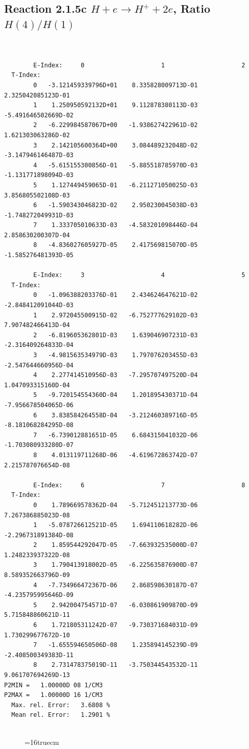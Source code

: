 \documentclass[12pt,dvipdfmx]{article}
\begin{document}
\newpage
\subsection{
Reaction 2.1.5c  $H + e \rightarrow H^+ + 2e$, Ratio $H(4)/H(1)$
}


\begin{small}\begin{verbatim}


        E-Index:     0                     1                     2
  T-Index:
        0   -3.121459339796D+01    8.335828009713D-01    2.325042085123D-01
        1    1.250950592132D+01    9.112878380113D-03   -5.491646502669D-02
        2   -6.229984587067D+00   -1.938627422961D-02    1.621303063286D-02
        3    2.142105600364D+00    3.084489232048D-02   -3.147946146487D-03
        4   -5.615155300856D-01   -5.885518785970D-03   -1.131771898094D-03
        5    1.127449459065D-01   -6.211271050025D-03    3.856805502108D-03
        6   -1.590343046823D-02    2.950230045038D-03   -1.748272049931D-03
        7    1.333705010633D-03   -4.583201098446D-04    2.858630200307D-04
        8   -4.836027605927D-05    2.417569815070D-05   -1.585276481393D-05

        E-Index:     3                     4                     5
  T-Index:
        0   -1.096388203376D-01    2.434624647621D-02   -2.848412091044D-03
        1    2.972045500915D-02   -6.752777629102D-03    7.907482466413D-04
        2   -6.819605362801D-03    1.639046907231D-03   -2.316409264833D-04
        3   -4.981563534979D-03    1.797076203455D-03   -2.547644660956D-04
        4    2.277414510956D-03   -7.295707497520D-04    1.047093315160D-04
        5   -9.720154554360D-04    1.201895430371D-04   -7.956678504065D-06
        6    3.838584264558D-04   -3.212460389716D-05   -8.181068284295D-08
        7   -6.739012881651D-05    6.684315041032D-06   -1.703080933280D-07
        8    4.013119711268D-06   -4.619672863742D-07    2.215787076654D-08

        E-Index:     6                     7                     8
  T-Index:
        0    1.789669578362D-04   -5.712451213773D-06    7.267386885023D-08
        1   -5.078726612521D-05    1.694110618282D-06   -2.296731891384D-08
        2    1.859544292047D-05   -7.663932535000D-07    1.248233937322D-08
        3    1.790413918002D-05   -6.225635876900D-07    8.589352663796D-09
        4   -7.734966472367D-06    2.868598630187D-07   -4.235795995646D-09
        5    2.942004754571D-07   -6.030861909870D-09    5.715848860621D-11
        6    1.721805311242D-07   -9.730371684031D-09    1.730299677672D-10
        7   -1.655594650506D-08    1.235894145239D-09   -2.408500349383D-11
        8    2.731478375019D-11   -3.750344543532D-11    9.061707694269D-13
P2MIN =   1.00000D 08 1/CM3
P2MAX =   1.00000D 16 1/CM3
  Max. rel. Error:   3.6808 %
  Mean rel. Error:   1.2901 %


\end{verbatim}\end{small}
\begin{figure} \label{2.1.5c}
\epsfxsize=16truecm
\end{figure}
\end{document}

